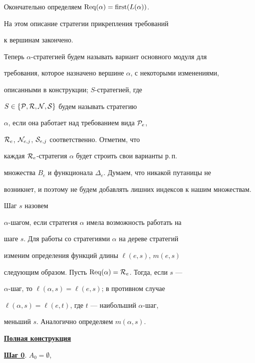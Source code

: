 Окончательно определяем $\operatorname{Req}(\alpha)=\operatorname{first}(L(\alpha))$.





\noindent На этом описание стратегии прикрепления требований


к вершинам закончено.


 


Теперь $\alpha$-стратегией будем называть вариант основного модуля для 


требования, которое назначено вершине $\alpha$, с некоторыми изменениями,


описанными в конструкции; $S$-стратегией, где


$S\in\{{\cal P},{\cal R},{\cal N},{\cal S}\}$ будем называть стратегию


$\alpha$, если она работает над требованием вида ${\cal P}_e$, 


${\cal R}_e$, ${\cal N}_{e,j}$, ${\cal S}_{e,j}$ соответственно. Отметим, что


каждая ${\cal R}_e$-стратегия $\alpha$ будет строить свои варианты р.\,п.


множества $B_e$ и функционала $\Delta_e$. Думаем, что никакой путаницы не


возникнет, и поэтому не будем добавлять лишних индексов к нашим множествам.


Шаг $s$ назовем


$\alpha$-шагом, если стратегия $\alpha$ имела возможность работать на


шаге $s$. Для работы со стратегиями $\alpha$ на дереве стратегий


изменим определения функций длины $\ell(e,s)$, $m(e,s)$


следующим образом. Пусть $\operatorname{Req}(\alpha)={\cal R}_e$. Тогда, если $s$ ---


$\alpha$-шаг, то $\ell(\alpha,s)=\ell(e,s)$; в противном случае


$\ell(\alpha,s)=\ell(e,t)$, где $t$ --- наибольший $\alpha$-шаг,


меньший $s$. Аналогично определяем $m(\alpha,s)$.


\pagebreak





\underline{\bf Полная конструкция}


\medskip





\noindent\underline{\bf Шаг 0}. $A_0=\emptyset$,


